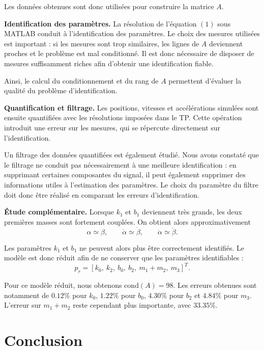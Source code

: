 \documentclass[10pt,a4paper,twocolumn]{article}
\begin{document}
Les données obtenues sont donc utilisées pour construire la matrice $A$.

\noindent\textbf{Identification des paramètres.} La résolution de l'équation $(1)$ sous MATLAB conduit à l'identification des paramètres.
Le choix des mesures utilisées est important : si les mesures sont trop
similaires, les lignes de $A$ deviennent proches et le problème est mal
conditionné. Il est donc nécessaire de disposer de mesures suffisamment
riches afin d'obtenir une identification fiable.

Ainsi, le calcul du conditionnement et du rang de $A$ permettent
d'évaluer la qualité du problème d'identification.

\noindent\textbf{Quantification et filtrage.} Les positions, vitesses et accélérations simulées sont ensuite quantifiées
avec les résolutions imposées dans le TP. Cette opération introduit une
erreur sur les mesures, qui se répercute directement sur l'identification.

Un filtrage des données quantifiées est également étudié. Nous avons
constaté que le filtrage ne conduit pas nécessairement à une meilleure
identification : en supprimant certaines composantes du signal, il peut
également supprimer des informations utiles à l'estimation des paramètres.
Le choix du paramètre du filtre doit donc être réalisé en comparant les
erreurs d'identification.

\noindent\textbf{Étude complémentaire.} Lorsque $k_1$ et $b_1$ deviennent très grands, les deux premières masses
sont fortement couplées. On obtient alors approximativement
\[
\alpha\simeq\beta,\qquad
\dot{\alpha}\simeq\dot{\beta},\qquad
\ddot{\alpha}\simeq\ddot{\beta}.
\]

Les paramètres $k_1$ et $b_1$ ne peuvent alors plus être correctement
identifiés. Le modèle est donc réduit afin de ne conserver que les
paramètres identifiables :
\[
p_r =
[k_0,\ k_2,\ b_0,\ b_2,\ m_1+m_2,\ m_3]^T.
\]

Pour ce modèle réduit, nous obtenons $\mathrm{cond}(A)=98$.
Les erreurs obtenues sont notamment de $0.12\%$ pour $k_0$,
$1.22\%$ pour $b_0$, $4.30\%$ pour $b_2$ et $4.84\%$ pour $m_3$.
L'erreur sur $m_1+m_2$ reste cependant plus importante, avec $33.35\%$.

\section*{Conclusion}
\end{document}
